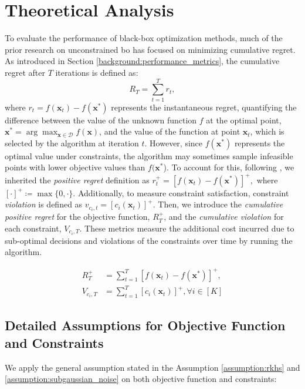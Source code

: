 \section{Theoretical Analysis}
To evaluate the performance of black-box optimization methods, much of the prior research on unconstrained \ac{bo} has focused on minimizing cumulative regret. As introduced in Section \ref{background:performance_metrics}, the cumulative regret after $T$ iterations is defined as:
\[
R_T = \sum_{t=1}^T r_t,  
\] 
where $r_t = f(\mathbf{x}_t) - f(\mathbf{x^*})$  represents the instantaneous regret, quantifying the difference between the value of the unknown function $f$ at the optimal point, $\mathbf{x}^* = \arg\max_{\mathbf{x} \in \mathcal{D}} f(\mathbf{x})$, and the value of the function at point $\mathbf{x}_t$, which is selected by the algorithm at iteration $t$. However, since $f(\mathbf{x^*})$ represents the optimal value under constraints, the algorithm may sometimes sample infeasible points with lower objective values than $f(\mathbf{x^*}$). To account for this, following \citet{xu2023constrained, nguyen2023optimistic}, we inherited the \textit{positive regret} definition as
$r_t^+ = [f(\mathbf{x}_t) - f(\mathbf{x^*})]^+,$
where $[\cdot]^+ \coloneqq \max\{0, \cdot\}$. Additionally, to measure constraint satisfaction, constraint \textit{violation} is defined as $
v_{c_i,t} = [c_i(\mathbf{x}_t)]^+$. 
Then, we introduce the \textit{cumulative positive regret} for the objective function, $R_T^+$, and the \textit{cumulative violation} for each constraint, $V_{c_i, T}$. These metrics measure the additional cost incurred due to sub-optimal decisions and violations of the constraints over time by running the algorithm.  
\begin{definition} 
    \begin{align*}
        R_T^+ &=\sum_{t=1}^T [f(\mathbf{x}_t) - f(\mathbf{x^*})]^+,
        \\
        V_{c_i, T}  &= \sum_{t=1}^T [c_i(\mathbf{x}_t)]^+, \forall i \in [K]
    \end{align*}
        
\end{definition}
\subsection{Detailed Assumptions for Objective Function and Constraints}

We apply the general assumption stated in the Assumption \ref{assumption:rkhs} and \ref{assumption:subgaussian_noise} on both objective function and constraints:

